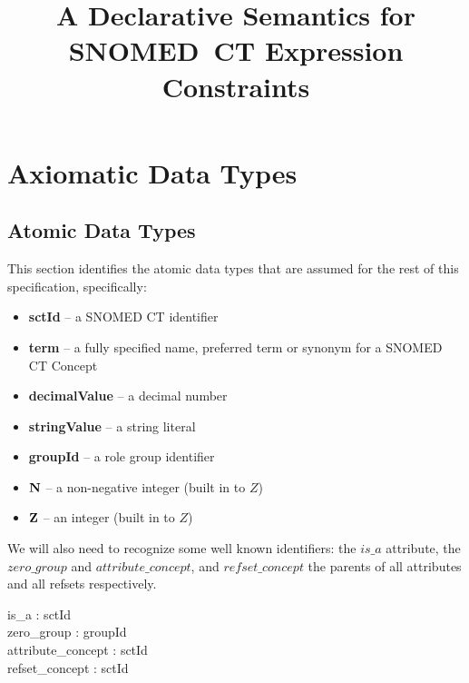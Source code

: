 \documentclass{article}
\title{A Declarative Semantics for SNOMED~CT Expression Constraints}
\begin{document}
\maketitle
\tableofcontents
\section{Axiomatic Data Types}
\subsection{Atomic Data Types}
This section identifies the atomic data types that are assumed for the rest of this specification, specifically:
\begin{itemize}[noitemsep]
\item \textbf{sctId} -- a SNOMED CT identifier
\item \textbf{term} --  a  fully specified name, preferred term or synonym for a SNOMED CT Concept
\item \textbf{decimalValue} --  a decimal number
\item \textbf{stringValue} -- a string literal
\item \textbf{groupId} -- a role group identifier
\item \textbf{${\mathbf{N}}$} -- a non-negative integer (built in to $Z$)
\item \textbf{${\mathbf{Z}}$} -- an integer (built in to $Z$)
\end{itemize}

\begin{zed}
\end{zed}


We will also need to recognize some well known identifiers: the $is\_a$ attribute, the $zero\_group$ and  $attribute\_concept$, and $refset\_concept$ the parents of all attributes and all refsets respectively.
\begin{axdef}
is\_a : sctId \\
zero\_group : groupId \\
attribute\_concept : sctId \\
refset\_concept : sctId
\end{axdef}
\end{document}
